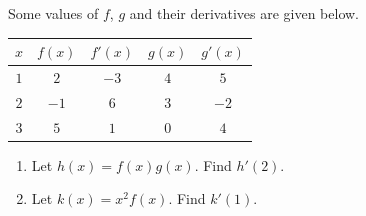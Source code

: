\documentclass[../main.tex]{subfiles}
\begin{document}
\begin{exercise} \label{ex:product-rule-table}
  Some values of \(f\), \(g\) and their derivatives are given below.
  \begin{center}
    \begin{tabular}{c|c|c|c|c}
      \(x\) & \(f(x)\) & \(f'(x)\) & \(g(x)\) & \(g'(x)\) \\\midrule
      \(1\) & \(2\)  & \(-3\) & \(4\) & \(5\) \\
      \(2\) & \(-1\) & \(6\)  & \(3\) & \(-2\) \\
      \(3\) & \(5\)  & \(1\)  & \(0\) & \(4\)
    \end{tabular}
  \end{center}

  \begin{enumerate}
    \item Let \(h(x) = f(x) g(x)\). Find \(h'(2)\).
    \item Let \(k(x) = x^{2} f(x)\). Find \(k'(1)\).
  \end{enumerate}

\end{exercise}
\clearpage
\end{document}

